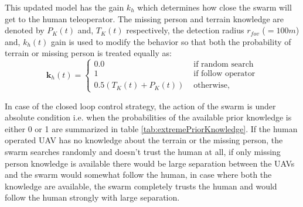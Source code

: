 \documentclass{article}
\begin{document}
This updated model has the gain $k_h$ which determines how close the swarm will get to the human teleoperator. 
The missing person and terrain knowledge are denoted by $P_K(t)$ and, $T_K(t)$ respectively, the detection radius $r_{fov}$ ($=100 m$) and, $k_h(t)$ gain is used to modify the behavior so that both the probability of terrain or missing person is treated equally as:
\begin{equation}
    \textbf{k}_{h}(t) = \left\{\begin{matrix} 0.0 & \text{ if random search} \\
    1 & \text{ if follow operator}\\
    0.5(T_K(t)+P_K(t))  & \text{ otherwise},
\end{matrix}\right.
\label{eq:zonalModel2}
\end{equation}

\begin{table}[htbp]
  \centering
  \caption{Control Loop strategies in extreme cases of prior knowledge.}
  \label{tab:extremePriorKnowledge}%
\end{table}%
In case of the closed loop control strategy, the action of the swarm is under absolute condition i.e. when the probabilities of the available prior knowledge is either 0 or 1 are summarized in table \ref{tab:extremePriorKnowledge}. If the human operated UAV has no knowledge about the terrain or the missing person, the swarm searches randomly and doesn't trust the human at all, if only missing person knowledge is available there would be large separation between the UAVs and the swarm would somewhat follow the human, in case where both the knowledge are available, the swarm completely trusts the human and would follow the human strongly with large separation.
\end{document}
